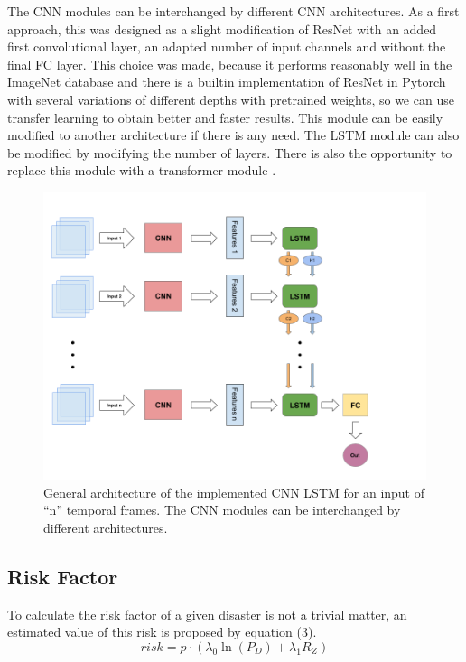 \documentclass[sigconf, nonacm]{acmart}
\begin{document}
The CNN modules can be interchanged by different CNN architectures. As a first approach, this was designed as a slight modification of ResNet \cite{Resnet} with an added first convolutional layer, an adapted number of input channels and without the final FC layer. This choice was made, because it performs reasonably well in the ImageNet database and there is a builtin implementation of ResNet in Pytorch with several variations of different depths with pretrained weights, so we can use transfer learning to obtain better and faster results. This module can be easily modified to another architecture if there is any need. The LSTM module can also be modified by modifying the number of layers. There is also the opportunity to replace this module with a transformer module \cite{Atention}. 


\begin{figure}
  \centering
  \includegraphics[width=1.2\linewidth]{figures/Architecture CNNLSTM(1).png}
  \caption{General architecture of the implemented CNN LSTM for an input of ``n'' temporal frames. The CNN modules can be interchanged by different architectures.}
  \label{fig:CNNLSTM}
\end{figure}

\subsection{Risk Factor}

To calculate the risk factor of a given disaster is not a trivial matter, %
an estimated value of this risk is proposed by equation (3).
\begin{equation}
  risk = p \cdot \left( \lambda_0 \ln(P_D) + \lambda_1 R_Z \right)  
\end{equation}
\end{document}
